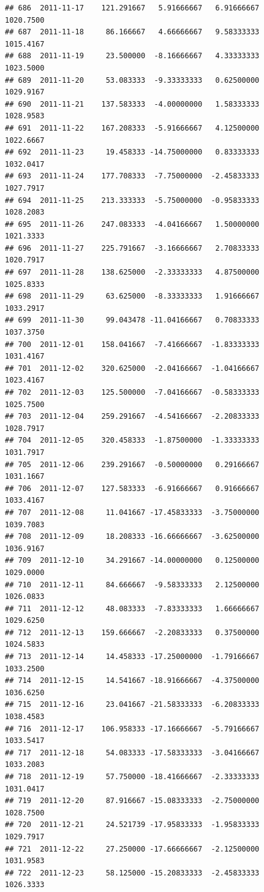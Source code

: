 \documentclass[
]{article}
\begin{document}
\begin{verbatim}
## 686  2011-11-17    121.291667   5.91666667   6.91666667    1020.7500
## 687  2011-11-18     86.166667   4.66666667   9.58333333    1015.4167
## 688  2011-11-19     23.500000  -8.16666667   4.33333333    1023.5000
## 689  2011-11-20     53.083333  -9.33333333   0.62500000    1029.9167
## 690  2011-11-21    137.583333  -4.00000000   1.58333333    1028.9583
## 691  2011-11-22    167.208333  -5.91666667   4.12500000    1022.6667
## 692  2011-11-23     19.458333 -14.75000000   0.83333333    1032.0417
## 693  2011-11-24    177.708333  -7.75000000  -2.45833333    1027.7917
## 694  2011-11-25    213.333333  -5.75000000  -0.95833333    1028.2083
## 695  2011-11-26    247.083333  -4.04166667   1.50000000    1021.3333
## 696  2011-11-27    225.791667  -3.16666667   2.70833333    1020.7917
## 697  2011-11-28    138.625000  -2.33333333   4.87500000    1025.8333
## 698  2011-11-29     63.625000  -8.33333333   1.91666667    1033.2917
## 699  2011-11-30     99.043478 -11.04166667   0.70833333    1037.3750
## 700  2011-12-01    158.041667  -7.41666667  -1.83333333    1031.4167
## 701  2011-12-02    320.625000  -2.04166667  -1.04166667    1023.4167
## 702  2011-12-03    125.500000  -7.04166667  -0.58333333    1025.7500
## 703  2011-12-04    259.291667  -4.54166667  -2.20833333    1028.7917
## 704  2011-12-05    320.458333  -1.87500000  -1.33333333    1031.7917
## 705  2011-12-06    239.291667  -0.50000000   0.29166667    1031.1667
## 706  2011-12-07    127.583333  -6.91666667   0.91666667    1033.4167
## 707  2011-12-08     11.041667 -17.45833333  -3.75000000    1039.7083
## 708  2011-12-09     18.208333 -16.66666667  -3.62500000    1036.9167
## 709  2011-12-10     34.291667 -14.00000000   0.12500000    1029.0000
## 710  2011-12-11     84.666667  -9.58333333   2.12500000    1026.0833
## 711  2011-12-12     48.083333  -7.83333333   1.66666667    1029.6250
## 712  2011-12-13    159.666667  -2.20833333   0.37500000    1024.5833
## 713  2011-12-14     14.458333 -17.25000000  -1.79166667    1033.2500
## 714  2011-12-15     14.541667 -18.91666667  -4.37500000    1036.6250
## 715  2011-12-16     23.041667 -21.58333333  -6.20833333    1038.4583
## 716  2011-12-17    106.958333 -17.16666667  -5.79166667    1033.5417
## 717  2011-12-18     54.083333 -17.58333333  -3.04166667    1033.2083
## 718  2011-12-19     57.750000 -18.41666667  -2.33333333    1031.0417
## 719  2011-12-20     87.916667 -15.08333333  -2.75000000    1028.7500
## 720  2011-12-21     24.521739 -17.95833333  -1.95833333    1029.7917
## 721  2011-12-22     27.250000 -17.66666667  -2.12500000    1031.9583
## 722  2011-12-23     58.125000 -15.20833333  -2.45833333    1026.3333

\end{verbatim}
\end{document}
